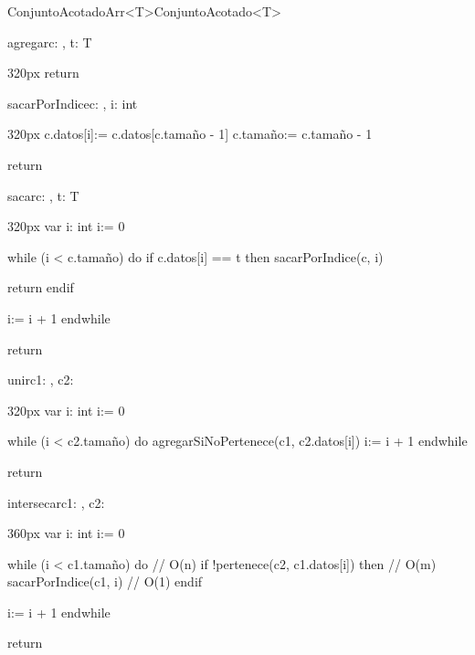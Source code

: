\documentclass[10pt,a4paper]{article}
\begin{document}
\begin{ModuloImplements}{ConjuntoAcotadoArr<T>}{ConjuntoAcotado<T>}
\begin{proc}{agregar}{\Inout c: , \In t: T}{}
\begin{ImplementationCode}{320px}
      return
    \end{ImplementationCode}
  \end{proc}
  \begin{proc}{sacarPorIndice}{\Inout c: , \In i: int}{}
    \begin{ImplementationCode}{320px}
      c.datos[i]:= c.datos[c.tamaño - 1]
      c.tamaño:= c.tamaño - 1

      return
    \end{ImplementationCode}
  \end{proc}
  \begin{proc}{sacar}{\Inout c: , \In t: T}{}
    \begin{ImplementationCode}{320px}
      var i: int
          i:= 0

      while (i < c.tamaño) do
        if c.datos[i] == t then
          sacarPorIndice(c, i)

          return
        endif

        i:= i + 1
      endwhile

      return
    \end{ImplementationCode}
  \end{proc}
  \begin{proc}{unir}{\Inout c1: , \In c2: }{}
    \begin{ImplementationCode}{320px}
      var i: int
          i:= 0

      while (i < c2.tamaño) do
        agregarSiNoPertenece(c1, c2.datos[i])
        i:= i + 1
      endwhile

      return
    \end{ImplementationCode}
  \end{proc}
  \begin{proc}{intersecar}{\Inout c1: , \In c2: }{}
    \begin{ImplementationCode}{360px}
      var i: int
          i:= 0

      while (i < c1.tamaño) do              // O(n)
        if !pertenece(c2, c1.datos[i]) then // O(m)
          sacarPorIndice(c1, i)             // O(1)
        endif

        i:= i + 1
      endwhile

      return
    \end{ImplementationCode}
  \end{proc}
\end{ModuloImplements}
\end{document}
